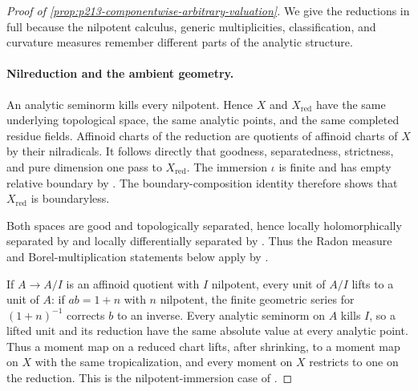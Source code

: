 
\begin{proof}[Proof of
\cref{prop:p213-componentwise-arbitrary-valuation}]
We give the reductions in full because the nilpotent calculus, generic
multiplicities, classification, and curvature measures remember different
parts of the analytic structure.

\paragraph{Nilreduction and the ambient geometry.}
An analytic seminorm kills every nilpotent.  Hence $X$ and
$X_{\mathrm{red}}$ have the same underlying topological space, the same
analytic points, and the same completed residue fields.  Affinoid charts of
the reduction are quotients of affinoid charts of $X$ by their nilradicals.
It follows directly that goodness, separatedness, strictness, and pure
dimension one pass to $X_{\mathrm{red}}$.  The immersion $\iota$ is finite
and has empty relative boundary by \cite[\S11.4.4]{CLD25}.  The
boundary-composition identity \cite[(11.4.1.3)]{CLD25} therefore shows that
$X_{\mathrm{red}}$ is boundaryless.

Both spaces are good and topologically separated, hence locally
holomorphically separated by \cite[\S15.2.2]{CLD25} and locally
differentially separated by \cite[Corollary~15.2.4]{CLD25}.  Thus the Radon
measure and Borel-multiplication statements below apply by
\cite[Lemma~7.2.4, Proposition~7.2.8, and Example~7.2.12]{CLD25}.

If $A\to A/I$ is an affinoid quotient with $I$ nilpotent, every unit of
$A/I$ lifts to a unit of $A$: if $ab=1+n$ with $n$ nilpotent, the finite
geometric series for $(1+n)^{-1}$ corrects $b$ to an inverse.  Every
analytic seminorm on $A$ kills $I$, so a lifted unit and its reduction have
the same absolute value at every analytic point.  Thus a moment map on a
reduced chart lifts, after shrinking, to a moment map on $X$ with the same
tropicalization, and every moment on $X$ restricts to one on the reduction.
This is the nilpotent-immersion case of
\cite[Proposition~15.1.3(b) and the following form variant]{CLD25}.


\end{proof}
